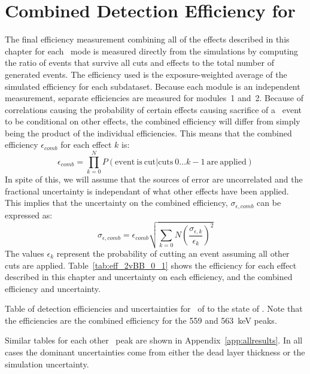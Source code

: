 \documentclass[/main.tex]{subfiles}
\begin{document}
\section{Combined Detection Efficiency for \bbes}
The final efficiency measurement combining all of the effects described in this chapter for each \bbes\ mode is measured directly from the simulations by computing the ratio of events that survive all cuts and effects to the total number of generated events.
The efficiency used is the exposure-weighted average of the simulated efficiency for each subdataset.
Because each module is an independent measurement, separate efficiencies are measured for modules~1 and~2.
Because of correlations causing the probability of certain effects causing sacrifice of a \bbes\ event to be conditional on other effects, the combined efficiency will differ from simply being the product of the individual efficiencies.
This means that the combined efficiency $\epsilon_{comb}$ for each effect $k$ is:
\begin{equation}
  \epsilon_{comb} = \prod_{k=0}^N P(\mathrm{event~is~cut} | \mathrm{cuts~} 0\dots k-1 \mathrm{~are~applied})
\end{equation}
In spite of this, we will assume that the sources of error are uncorrelated and the fractional uncertainty is independant of what other effects have been applied.
This implies that the uncertainty on the combined efficiency, $\sigma_{\epsilon,comb}$ can be expressed as:
\begin{equation}
  \sigma_{\epsilon,comb}=\epsilon_{comb} \sqrt{ \sum_{k=0}{N} (\frac{\sigma_{\epsilon,k}}{\epsilon_k})^2 }
\end{equation}
The values $\epsilon_k$ represent the probability of cutting an event assuming all other cuts are applied.
Table~\ref{tab:eff_2vBB_0_1} shows the efficiency for each effect described in this chapter and uncertainty on each efficiency, and the combined efficiency and uncertainty.
\begin{table}[h]
  \centering
  
  \caption[Detection efficiency summary for \tnbb\ to the  state of ]{\label{tab:eff_2vBB_0_1}
    Table of detection efficiencies and uncertainties for \tnbb\ of  to the  state of . Note that the efficiencies are the combined efficiency for the 559 and 563~keV peaks.
  }
\end{table}
Similar tables for each other \bbes\ peak are shown in Appendix~\ref{app:allresults}.
In all cases the dominant uncertainties come from either the dead layer thickness or the simulation uncertainty.
\end{document}

